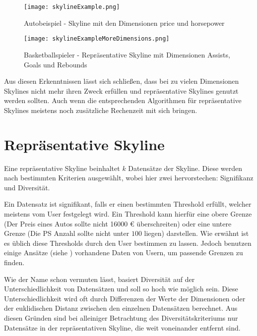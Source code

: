 \begin{figure}[H]
	\centering
	\texttt{[image: skylineExample.png]}
	\caption{Autobeispiel - Skyline mit den Dimensionen price und horsepower}
	\label{img:skylineExample}
\end{figure}


\begin{figure}[H]
	\centering
	\begin{adjustbox}{max size={\textwidth}{\textheight}}
    \texttt{[image: skylineExampleMoreDimensions.png]}
\end{adjustbox}
	\caption{Basketballspieler - Repräsentative Skyline mit Dimensionen Assists, Goals und Rebounds}
	\label{img:skylineExampleMoreDimensions}
\end{figure}

Aus diesen Erkenntnissen lässt sich schließen, dass bei zu vielen Dimensionen Skylines nicht mehr ihren Zweck erfüllen und repräsentative Skylines genutzt werden sollten. Auch wenn die entsprechenden Algorithmen für repräsentative Skylines meistens noch zusätzliche Rechenzeit mit sich bringen.
\section{Repräsentative Skyline}
\label{ch:Grundlagen:sec:repSkyline}
Eine repräsentative Skyline beinhaltet $k$ Datensätze der Skyline. Diese werden nach bestimmten Kriterien ausgewählt, wobei hier zwei hervorstechen: Signifikanz und Diversität.

Ein Datensatz ist signifikant, falls er einen bestimmten Threshold erfüllt, welcher meistens vom User festgelegt wird. Ein Threshold kann hierfür eine obere Grenze (Der Preis eines Autos sollte nicht 16000 \euro{} überschreiten) oder eine untere Grenze (Die PS Anzahl sollte nicht unter $100$ liegen) darstellen. 
Wie erwähnt ist es üblich diese Thresholds durch den User bestimmen zu lassen. Jedoch benutzen einige Ansätze (siehe \cite{36988}) vorhandene Daten von Usern, um passende Grenzen zu finden.

Wie der Name schon vermuten lässt, basiert Diversität auf der Unterschiedlichkeit von Datensätzen und soll so hoch wie möglich sein. Diese Unterschiedlichkeit wird oft durch Differenzen der Werte der Dimensionen oder der euklidischen Distanz zwischen den einzelnen Datensätzen berechnet. 
Aus diesen Gründen sind bei alleiniger Betrachtung des Diversitätskriteriums nur Datensätze in der repräsentativen Skyline, die weit voneinander entfernt sind. 


